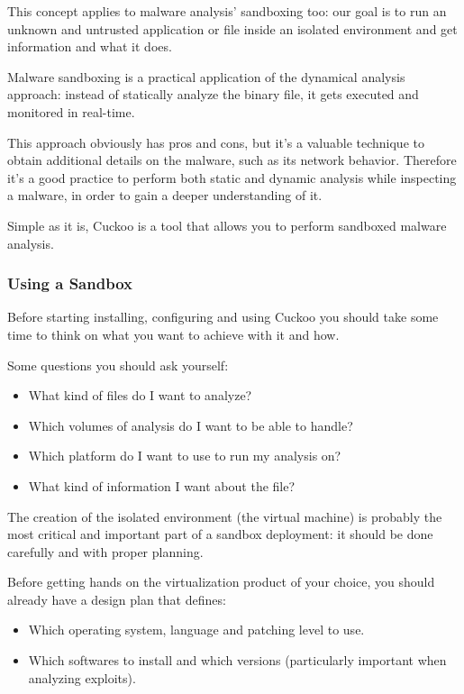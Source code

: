 \documentclass[letterpaper,10pt,english]{sphinxmanual}
\begin{document}
This concept applies to malware analysis' sandboxing too: our goal is to run an
unknown and untrusted application or file inside an isolated environment and get
information and what it does.

Malware sandboxing is a practical application of the dynamical analysis
approach: instead of statically analyze the binary file, it gets executed and
monitored in real-time.

This approach obviously has pros and cons, but it's a valuable technique to
obtain additional details on the malware, such as its network behavior.
Therefore it's a good practice to perform both static and dynamic analysis while
inspecting a malware, in order to gain a deeper understanding of it.

Simple as it is, Cuckoo is a tool that allows you to perform sandboxed malware
analysis.


\subsubsection{Using a Sandbox}
\label{introduction/sandboxing:wikipedia}\label{introduction/sandboxing:using-a-sandbox}
Before starting installing, configuring and using Cuckoo you should take some
time to think on what you want to achieve with it and how.

Some questions you should ask yourself:
\begin{itemize}
\item {} 
What kind of files do I want to analyze?

\item {} 
Which volumes of analysis do I want to be able to handle?

\item {} 
Which platform do I want to use to run my analysis on?

\item {} 
What kind of information I want about the file?

\end{itemize}

The creation of the isolated environment (the virtual machine) is probably the
most critical and important part of a sandbox deployment: it should be done
carefully and with proper planning.

Before getting hands on the virtualization product of your choice, you should
already have a design plan that defines:
\begin{itemize}
\item {} 
Which operating system, language and patching level to use.

\item {} 
Which softwares to install and which versions (particularly important when analyzing exploits).

\end{itemize}
\end{document}
